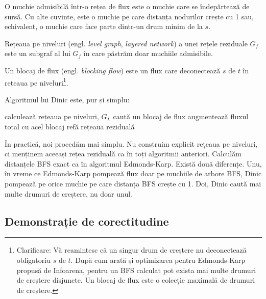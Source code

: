\documentclass[../main.tex]{subfiles}
\begin{document}
\begin{definition}
  O muchie admisibilă într-o rețea de flux este o muchie care se îndepărtează de sursă. Cu alte cuvinte, este o muchie pe care distanța nodurilor crește cu 1 sau, echivalent, o muchie care face parte dintr-un drum minim de la $s$.
\end{definition}

\begin{definition}
Rețeaua pe niveluri (engl. \textit{level graph}, \textit{layered network}) a unei rețele reziduale $G_f$ este un subgraf al lui $G_f$ în care păstrăm doar muchiile admisibile.
\end{definition}

\begin{definition}
Un blocaj de flux (engl. \textit{blocking flow}) este un flux care deconectează $s$ de $t$ în rețeaua pe niveluri\footnote{Clarificare: Vă reamintesc că un singur drum de creștere nu deconectează obligatoriu $s$ de $t$. După cum arată și optimizarea pentru Edmonds-Karp propusă de Infoarena, pentru un BFS calculat pot exista mai multe drumuri de creștere disjuncte. Un blocaj de flux este o colecție maximală de drumuri de creștere.}.
\end{definition}

Algoritmul lui Dinic este, pur și simplu:

\begin{algorithm}[H]
  \caption{Algoritmul lui Dinic}
  \begin{algorithmic}[1]
      \State calculează rețeaua pe niveluri, $G_L$
      \State caută un blocaj de flux
      \State augmentează fluxul total cu acel blocaj
      \State refă rețeaua reziduală
    \EndWhile
  \end{algorithmic}
\end{algorithm}


În practică, noi procedăm mai simplu. Nu construim explicit rețeaua pe niveluri, ci menținem aceeași rețea reziduală ca în toți algoritmii anteriori. Calculăm distanțele BFS exact ca în algoritmul Edmonds-Karp. Există două diferențe. Unu, în vreme ce Edmonds-Karp pompează flux doar pe muchiile de arbore BFS, Dinic pompează pe orice muchie pe care distanța BFS crește cu 1. Doi, Dinic caută mai multe drumuri de creștere, nu doar unul.

\subsection{Demonstrație de corectitudine}
\end{document}
